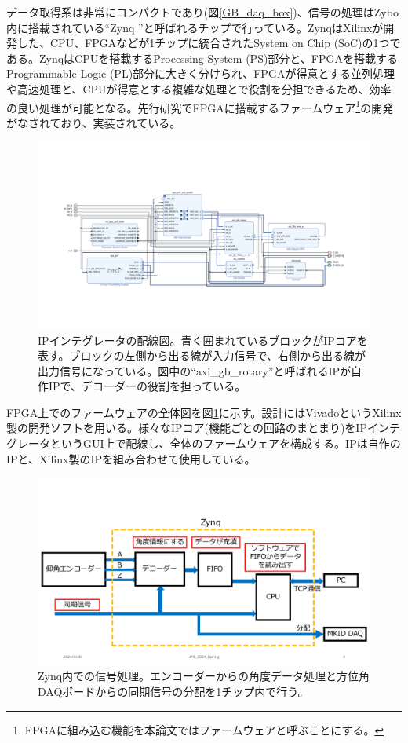 データ取得系は非常にコンパクトであり(図\ref{GB_daq_box})、信号の処理はZybo内に搭載されている``Zynq \cite{Zynq}''と呼ばれるチップで行っている。ZynqはXilinxが開発した、CPU、FPGAなどが1チップに統合されたSystem on Chip (SoC)の1つである。ZynqはCPUを搭載するProcessing System (PS)部分と、FPGAを搭載するProgrammable Logic (PL)部分に大きく分けられ、FPGAが得意とする並列処理や高速処理と、CPUが得意とする複雑な処理とで役割を分担できるため、効率の良い処理が可能となる。先行研究でFPGAに搭載するファームウェア\footnote{FPGAに組み込む機能を本論文ではファームウェアと呼ぶことにする。}の開発がなされており、実装されている。

\begin{figure}[htbp]
  \centering
  \includegraphics[width=1.0\columnwidth]{4_elDAQ/figs/block_diagram.pdf}
  \caption{IPインテグレータの配線図。青く囲まれているブロックがIPコアを表す。ブロックの左側から出る線が入力信号で、右側から出る線が出力信号になっている。図中の``axi\_gb\_rotary''と呼ばれるIPが自作IPで、デコーダーの役割を担っている。}
  \label{block_diagram}
\end{figure}

FPGA上でのファームウェアの全体図を図\ref{block_diagram}に示す。設計にはVivado\cite{Vivado}というXilinx製の開発ソフトを用いる。様々なIPコア(機能ごとの回路のまとまり)をIPインテグレータというGUI上で配線し、全体のファームウェアを構成する。IPは自作のIPと、Xilinx製のIPを組み合わせて使用している。

\begin{figure}[htbp]
  \centering
  \includegraphics[width=1.0\columnwidth]{4_elDAQ/figs/zynq_flow.pdf}
  \caption{Zynq内での信号処理。エンコーダーからの角度データ処理と方位角DAQボードからの同期信号の分配を1チップ内で行う。}
  \label{zynq_flow}
\end{figure}


